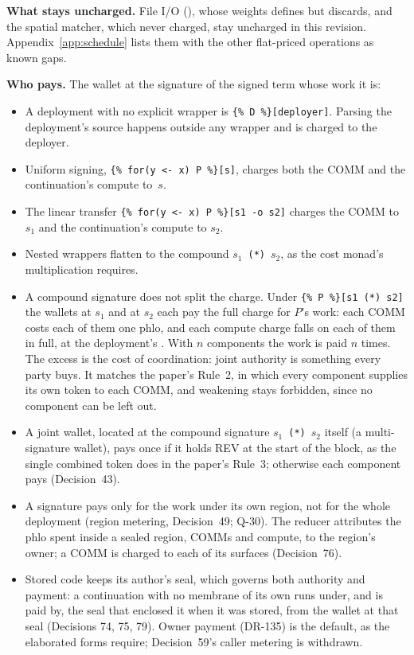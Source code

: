 \documentclass[11pt]{article}
\newcommand{\code}{\path}
\newcommand{\signed}[2]{\texttt{\{\%\,#1\,\%\}[#2]}}
\begin{document}
\textbf{What stays uncharged.} File I/O (\code{rho:io:fs:native:*}), whose weights \code{dev} defines but discards, and the spatial matcher, which \code{dev} never charged, stay uncharged in this revision. Appendix~\ref{app:schedule} lists them with the other flat-priced operations as known gaps.

\textbf{Who pays.} The wallet at the signature of the signed term whose work it is:
\begin{itemize}
\item A deployment with no explicit wrapper is \signed{D}{deployer}. Parsing the deployment's source happens outside any wrapper and is charged to the deployer.
\item Uniform signing, \signed{for(y <- x) P}{s}, charges both the COMM and the continuation's compute to~$s$.
\item The linear transfer \signed{for(y <- x) P}{s1 -o s2} charges the COMM to $s_1$ and the continuation's compute to $s_2$.
\item Nested wrappers flatten to the compound $s_1$~\texttt{(*)}~$s_2$, as the cost monad's multiplication requires.
\item A compound signature does not split the charge. Under \signed{P}{s1 (*) s2} the wallets at $s_1$ and at $s_2$ each pay the full charge for $P$'s work: each COMM costs each of them one phlo, and each compute charge falls on each of them in full, at the deployment's \code{phloPrice}. With $n$ components the work is paid $n$ times. The excess is the cost of coordination: joint authority is something every party buys. It matches the paper's Rule~2, in which every component supplies its own token to each COMM, and weakening stays forbidden, since no component can be left out.
\item A joint wallet, located at the compound signature $s_1$~\texttt{(*)}~$s_2$ itself (a multi-signature wallet), pays once if it holds REV at the start of the block, as the single combined token does in the paper's Rule~3; otherwise each component pays (Decision~43).
\item A signature pays only for the work under its own region, not for the whole deployment (region metering, Decision~49; Q-30). The reducer attributes the phlo spent inside a sealed region, COMMs and compute, to the region's owner; a COMM is charged to each of its surfaces (Decision~76).
\item Stored code keeps its author's seal, which governs both authority and payment: a continuation with no membrane of its own runs under, and is paid by, the seal that enclosed it when it was stored, from the wallet at that seal (Decisions 74, 75, 79). Owner payment (DR-135) is the default, as the elaborated forms require; Decision~59's caller metering is withdrawn.

\end{itemize}
\end{document}
